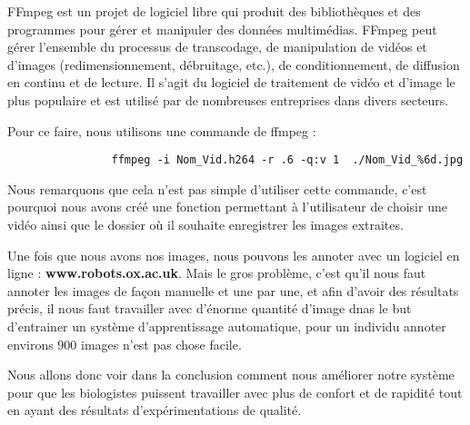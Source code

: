         \vspace{0.2cm}

        FFmpeg est un projet de logiciel libre qui produit des bibliothèques et des programmes pour gérer et manipuler des données multimédias. FFmpeg peut gérer l'ensemble du processus de transcodage, de manipulation de vidéos et d'images (redimensionnement, débruitage, etc.), de conditionnement, de diffusion en continu et de lecture. Il s'agit du logiciel de traitement de vidéo et d'image le plus populaire et est utilisé par de nombreuses entreprises dans divers secteurs.

        \begin{flushleft}
            Pour ce faire, nous utilisons une commande de ffmpeg :
        
            \begin{verbatim}
                ffmpeg -i Nom_Vid.h264 -r .6 -q:v 1  ./Nom_Vid_%6d.jpg
            \end{verbatim}            


        \end{flushleft}

        Nous remarquons que cela n'est pas simple d'utiliser cette commande, c'est pourquoi nous avons créé une fonction permettant à l'utilisateur de choisir une vidéo ainsi que le dossier où il souhaite enregistrer les images extraites. 
        
        \vspace{0.2cm}

        Une fois que nous avons nos images, nous pouvons les annoter avec un logiciel en ligne : \textbf{www.robots.ox.ac.uk}.
        Mais le gros problème, c'est qu'il nous faut annoter les images de façon manuelle et une par une, et afin d'avoir des résultats précis, il nous faut travailler avec d'énorme quantité d'image dnas le but d'entrainer un système d'apprentissage automatique, pour un individu annoter environs 900 images n'est pas chose facile.

        \vspace{0.2cm}

        Nous allons donc voir dans la conclusion comment nous améliorer notre système pour que les biologistes puissent travailler avec plus de confort et de rapidité tout en ayant des résultats d'expérimentations de qualité.
